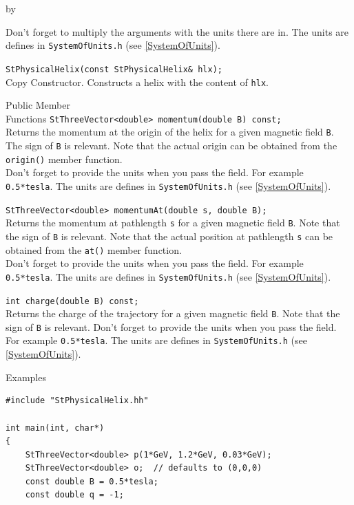 \documentclass[twoside]{article}
\newcommand{\comp}[1]{\texttt{#1}}%
\newcommand{\entrylabel}[1]{\mbox{\textbf{{#1}}}\hfil}%
\newenvironment{entry}
{\begin{list}{}%
    {\renewcommand{\makelabel}{\entrylabel}%
     \setlength{\labelwidth}{90pt}%
     \setlength{\leftmargin}{\labelwidth}
     \advance\leftmargin by \labelsep%
      }%
    }%
  {\end{list}}
\newcommand{\Entrylabel}[1]%
{\raisebox{0pt}[1ex][0pt]{\makebox[\labelwidth][l]%
    {\parbox[t]{\labelwidth}{\hspace{0pt}\textbf{{#1}}}}}}
\newenvironment{Entry}%
{\renewcommand{\entrylabel}{\Entrylabel}\begin{entry}}%
  {\end{entry}}
\begin{document}
\begin{Entry}
    Don't forget to multiply the arguments with the units there are
    in. The units are defines in \texttt{SystemOfUnits.h}
    (see \ref{SystemOfUnits}).
    
    \verb+StPhysicalHelix(const StPhysicalHelix& hlx);+\\
    Copy Constructor. Constructs a helix with the content of \comp{hlx}.
            
\item[Public Member\\ Functions]
    \verb+StThreeVector<double> momentum(double B) const;+\\
    Returns the momentum at the origin of the helix for a given magnetic
    field \comp{B}. The sign of \comp{B} is relevant.
    Note that the actual origin can be obtained from the 
    \comp{origin()} member function.\\
    Don't forget to provide the units when you pass the field. For example
    \texttt{0.5*tesla}. The units are defines in \texttt{SystemOfUnits.h}
    (see \ref{SystemOfUnits}).

    \verb+StThreeVector<double> momentumAt(double s, double B);+\\
    Returns the momentum at pathlength \comp{s} for a given magnetic
    field \comp{B}. Note that the sign of \comp{B} is relevant.
    Note that the actual position at pathlength \comp{s} can be
    obtained from the \comp{at()} member function.\\
    Don't forget to provide the units when you pass the field. For example
    \texttt{0.5*tesla}. The units are defines in \texttt{SystemOfUnits.h}
    (see \ref{SystemOfUnits}).
    
    \verb+int charge(double B) const;+\\
    Returns the charge of the trajectory for a given magnetic
    field \comp{B}. Note that the sign of \comp{B} is relevant.
    Don't forget to provide the units when you pass the field. For example
    \texttt{0.5*tesla}. The units are defines in \texttt{SystemOfUnits.h}
    (see \ref{SystemOfUnits}).
    
\item[Examples]
{\footnotesize
\begin{verbatim}
#include "StPhysicalHelix.hh"

int main(int, char*)
{
    StThreeVector<double> p(1*GeV, 1.2*GeV, 0.03*GeV);
    StThreeVector<double> o;  // defaults to (0,0,0)
    const double B = 0.5*tesla;
    const double q = -1;


\end{verbatim}}
\end{Entry}
\end{document}
